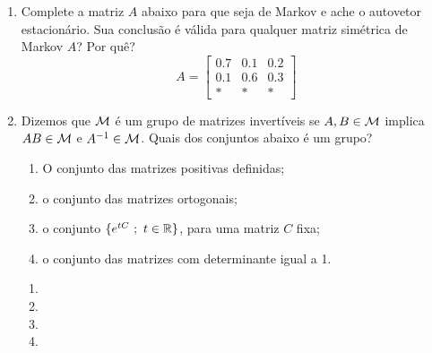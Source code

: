 \documentclass[leqno]{article}
\numberwithin{equation}{section}
\begin{document}
\begin{enumerate}
\begin{sol} 
\end{sol} 


\item Complete a matriz $A$ abaixo para que seja de Markov e ache o autovetor estacionário. Sua conclusão é válida para qualquer matriz simétrica de Markov $A$? Por quê?
$$A = \begin{bmatrix}
0.7 & 0.1 & 0.2 \\
0.1 & 0.6 & 0.3 \\
* & * & *
\end{bmatrix}$$

\begin{sol} 
\end{sol} 


\item Dizemos que $\mathcal{M}$ é um grupo de matrizes invertíveis se $A, B \in \mathcal{M}$ implica $AB \in \mathcal{M}$ e $A^{-1} \in \mathcal{M}$. Quais dos conjuntos abaixo é um grupo?  

\begin{enumerate}

\item O conjunto das matrizes positivas definidas;

\item o conjunto das matrizes ortogonais;

\item o conjunto $\{e^{tC} \ ; \ t \in \mathbb{R}\}$, para uma matriz $C$ fixa;

\item o conjunto das matrizes com determinante igual a 1.

\end{enumerate}

\begin{sol} 
	\vspace{-\baselineskip}  
	\begin{enumerate} 
		\item %
		\item %
		\item %
		\item %
	\end{enumerate} 
\end{sol} 


\end{enumerate}
\end{document}

